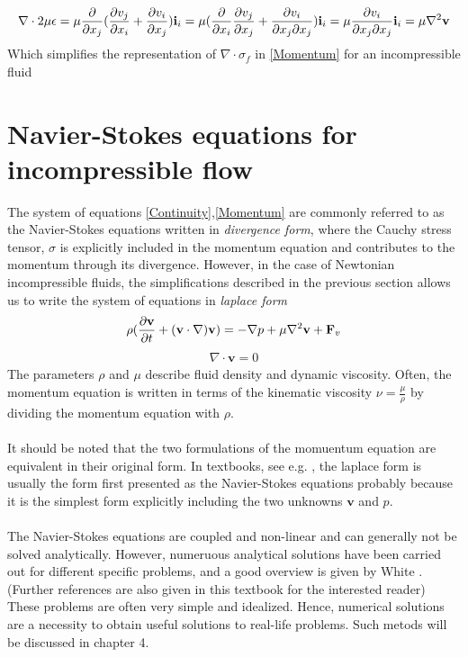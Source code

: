 \begin{align*}
\nabla \cdot 2\mu \epsilon = \mu\frac{\partial }{\partial x_j}(\frac{\partial v_j}{\partial x_i} + \frac{\partial v_i}{\partial x_j})\mathbf{i}_i = \mu(\frac{\partial }{\partial x_i}\frac{\partial v_j}{\partial x_j} + \frac{\partial v_i}{\partial x_j \partial x_j})\mathbf{i}_i = \mu\frac{\partial v_i}{\partial x_j \partial x_j} \mathbf{i}_i = \mu\nabla^2\mathbf{v}
\end{align*}
Which simplifies the representation of $\nabla \cdot \sigma_f$ in \eqref{Momentum} for an incompressible fluid


\section{Navier-Stokes equations for incompressible flow}
The system of equations \eqref{Continuity},\eqref{Momentum} are commonly referred to as the Navier-Stokes equations written in \textit{divergence form}, where the Cauchy stress tensor, $\sigma$ is explicitly included in the momentum equation and contributes to the momentum through its divergence. However, in the case of Newtonian incompressible fluids, the simplifications described in the previous section allows us to write the system of equations in \textit{laplace form}
\begin{align}
\rho(\frac{\partial \mathbf{v}}{\partial t} + (\mathbf{v} \cdot \nabla) \mathbf{v}) = -\nabla p + \mu\nabla^2 \mathbf{v} + \mathbf{F}_v \label{Navier}
\end{align}
\begin{align}
\nabla \cdot \mathbf{v} = 0 \label{Stokes}
\end{align}
The parameters $\rho$ and $\mu$ describe fluid density and dynamic viscosity. Often, the momentum equation is written in terms of the kinematic viscosity $\nu = \frac{\mu}{\rho}$ by dividing the momentum equation with $\rho$. \\
\\
It should be noted that the two formulations of the momuentum equation are equivalent in their original form. In textbooks, see e.g. \cite{Newm77,Whit06,Kund2012}, the laplace form is usually the form first presented as the Navier-Stokes equations probably because it is the simplest form explicitly including the two unknowns $\mathbf{v}$ and $p$. \\
\\
The Navier-Stokes equations are coupled and non-linear and can generally not be solved analytically. However, numeruous analytical solutions have been carried out for different specific problems, and a good overview is given by White \cite[pp. 97-164]{Whit06}. (Further references are also given in this textbook for the interested reader) These problems are often very simple and idealized. Hence, numerical solutions are a necessity to obtain useful solutions to real-life problems. Such metods will be discussed in chapter 4. 
